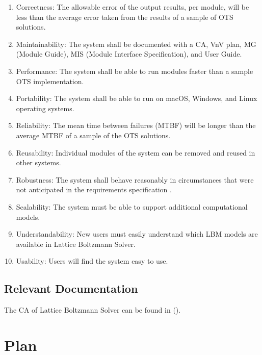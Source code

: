 \documentclass[12pt, titlepage]{article}
\newcommand{\famname}{Lattice Boltzmann Solver}
\begin{document}
\begin{enumerate}
\item Correctness: The allowable error of the output results, per module, will
  be less than the average error taken from the results of a sample of OTS
  solutions. 
\item Maintainability: The system shall be documented with a CA, VnV plan, MG
  (Module Guide), MIS (Module Interface Specification), and User Guide.
\item Performance: The system shall be able to run modules faster than a sample
  OTS implementation.
\item Portability: The system shall be able to run on macOS, Windows, and Linux
  operating systems.
\item Reliability: The mean time between failures (MTBF) will be longer than the
  average MTBF of a sample of the OTS solutions.
\item Reusability: Individual modules of the system can be removed and reused in
  other systems.
\item Robustness: The system shall behave reasonably in circumstances that were
  not anticipated in the requirements specification
  \cite{ghezzi1991fundamentals}.
\item Scalability: The system must be able to support additional computational
  models.
\item Understandability: New users must easily understand which LBM models are
  available in {\famname}.
\item Usability: Users will find the system easy to use.
\end{enumerate}

\subsection{Relevant Documentation}

The CA of {\famname} can be found in (\citet{LBM_CA_PM}).  
\newpage

\section{Plan}
\label{testplan}	
\end{document}
